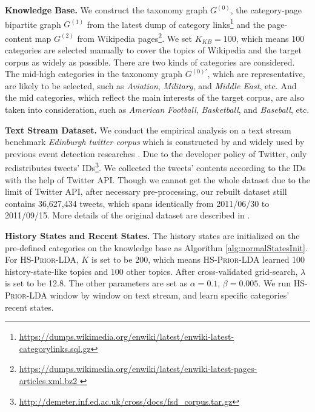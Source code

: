 \documentclass{article}
\begin{document}
\textbf{Knowledge Base.} 
We construct the taxonomy graph \(G^{(0)}\), the category-page bipartite graph \(G^{(1)}\) from the latest dump of category links\footnote{\url{https://dumps.wikimedia.org/enwiki/latest/enwiki-latest-categorylinks.sql.gz}} and the page-content map \(G^{(2)}\) from Wikipedia pages\footnote{\url{https://dumps.wikimedia.org/enwiki/latest/enwiki-latest-pages-articles.xml.bz2 }}.
We set \(K_{KB}=100\), which means 100 categories are selected manually to cover the topics of Wikipedia and the target corpus as widely as possible. 
There are two kinds of categories are considered. 
The mid-high categories in the taxonomy graph \(G^{(0)'}\), which are representative, are likely to be selected, such as \textit{Aviation}, \textit{Military}, and \textit{Middle East}, etc.
And the mid categories, which reflect the main interests of the target corpus, are also taken into consideration, such as \textit{American Football}, \textit{Basketball}, and \textit{Baseball}, etc. 

\textbf{Text Stream Dataset.} We conduct the empirical analysis on a text stream benchmark \textit{Edinburgh twitter corpus} which is constructed by \cite{petrovic2012using} and widely used by previous event detection researches \cite{petrovic2013can} \cite{Wurzer:2015wq}. 
Due to the developer policy of Twitter, \cite{petrovic2012using} only redistributes tweets' IDs\footnote{\url{http://demeter.inf.ed.ac.uk/cross/docs/fsd_corpus.tar.gz}}.
We collected the tweets' contents according to the IDs with the help of Twitter API. 
Though we cannot get the whole dataset due to the limit of Twitter API, after necessary pre-processing, our rebuilt dataset still contains 36,627,434 tweets, which spans identically from 2011/06/30 to 2011/09/15.
More details of the original dataset are described in \cite{petrovic2010edinburgh}.

\textbf{History States and Recent States.} 
The history states are initialized on the pre-defined categories on the knowledge base as Algorithm \ref{alg:normalStatesInit}.
For \textsc{HS-Prior-LDA}, \(K\) is set to be 200, which means \textsc{HS-Prior-LDA} learned 100 history-state-like topics and 100 other topics.
After cross-validated grid-search, \(\lambda\) is set to be 12.8. The other parameters are set as \(\alpha=0.1\), \(\beta=0.005\).
We run \textsc{HS-Prior-LDA} window by window on text stream, and learn specific categories' recent states.
\end{document}
